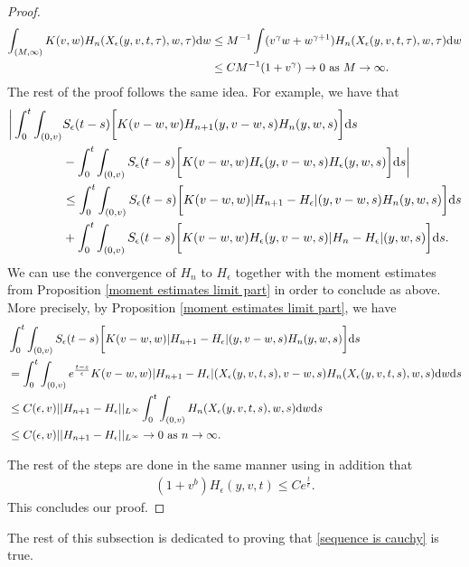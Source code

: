 \documentclass[11pt]{article}
\numberwithin{equation}{section}
\newcommand{\der}{\textup{d}}
\begin{document}
\begin{proof}
\begin{align*}
    \int_{(M,\infty)}K(v,w)H_{n}(X_{\epsilon}(y,v,t,\tau),w,\tau)\der w &\leq  M^{-1}\int (v^{\gamma}w+w^{\gamma+1})H_{n}(X_{\epsilon}(y,v,t,\tau),w,\tau)\der w \\
    & \leq C M^{-1}(1+v^{\gamma})\rightarrow 0
 \textup{ as } M\rightarrow\infty.\end{align*}
 The rest of the proof follows the same idea. For example, we have that
 \begin{align*}
\bigg|\int_{0}^{t}\int_{(0,v)}
&S_{\epsilon}(t-s)\bigg[K(v-w,w)H_{n+1}(y,v-w,s) H_{n}(y,w,s)\bigg]\der s\\
&-
\int_{0}^{t}\int_{(0,v)}
S_{\epsilon}(t-s)\bigg[K(v-w,w)H_{\epsilon}(y,v-w,s) H_{\epsilon}(y,w,s)\bigg]\der s\bigg|\\
&\leq \int_{0}^{t}\int_{(0,v)}S_{\epsilon}(t-s)\bigg[K(v-w,w)|H_{n+1}-H_{\epsilon}|(y,v-w,s) H_{n}(y,w,s)\bigg]\der s\\
&+\int_{0}^{t}\int_{(0,v)}
S_{\epsilon}(t-s)\bigg[K(v-w,w)H_{\epsilon}(y,v-w,s)|H_{n}- H_{\epsilon}|(y,w,s)\bigg]\der s.
\end{align*}
We can use the convergence of $H_{n}$ to $H_{\epsilon}$ together with the moment estimates from Proposition \ref{moment estimates limit part}  in order to conclude as above. More precisely, by Proposition \ref{moment estimates limit part}, we have
\begin{align*}
& \int_{0}^{t}\int_{(0,v)}S_{\epsilon}(t-s)\bigg[K(v-w,w)|H_{n+1}-H_{\epsilon}|(y,v-w,s) H_{n}(y,w,s)\bigg]\der s\\
   & = \int_{0}^{t}\int_{(0,v)}e^{\frac{t-s}{\epsilon}}K(v-w,w)|H_{n+1}-H_{\epsilon}|(X_{\epsilon}(y,v,t,s),v-w,s) H_{n}(X_{\epsilon}(y,v,t,s),w,s)\der w\der s\\
   & \leq C(\epsilon,v) ||H_{n+1}-H_{\epsilon}||_{L^{\infty}}\int_{0}^{t}\int_{(0,v)} H_{n}(X_{\epsilon}(y,v,t,s),w,s)\der w\der s\\
     & \leq C(\epsilon,v) ||H_{n+1}-H_{\epsilon}||_{L^{\infty}}\rightarrow 0 \textup{ as } n\rightarrow\infty.
\end{align*}

The rest of the steps are done in the same manner using in addition that
\begin{align*}
(1+v^{b})H_{\epsilon}(y,v,t)\leq Ce^{\frac{t}{\epsilon}}.
\end{align*}
 This concludes our proof.
\end{proof}

 The rest of this subsection is dedicated to proving that \eqref{sequence is cauchy} is true. 
\end{document}
